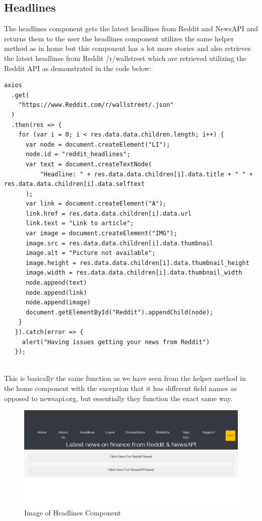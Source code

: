 \subsection{Headlines}
The headlines component gets the latest headlines from Reddit and NewsAPI and returns them to the user
the headlines component utilizes the same helper method as in home but this component has a lot more
stories and also retrieves the latest headlines from Reddit /r/wallstreet which are retrieved utilizing
the Reddit API as demonstrated in the code below:
\begin{verbatim}
axios
  .get(
    "https://www.Reddit.com/r/wallstreet/.json"
  )
  .then(res => {
    for (var i = 0; i < res.data.data.children.length; i++) {
      var node = document.createElement("LI");
      node.id = "reddit_headlines";
      var text = document.createTextNode(
          "Headline: " + res.data.data.children[i].data.title + " " + res.data.data.children[i].data.selftext
      );
      var link = document.createElement("A");
      link.href = res.data.data.children[i].data.url
      link.text = "Link to article";
      var image = document.createElement("IMG");
      image.src = res.data.data.children[i].data.thumbnail
      image.alt = "Picture not available";
      image.height = res.data.data.children[i].data.thumbnail_height
      image.width = res.data.data.children[i].data.thumbnail_width
      node.append(text)
      node.append(link)
      node.append(image)
      document.getElementById("Reddit").appendChild(node);
    }
   }).catch(error => {
     alert("Having issues getting your news from Reddit")
   });
\end{verbatim}
\\
This is basically the same function as we have seen from the helper method in the home component with the
exception that it has different field names as opposed to newsapi.org, but essentially they function the
exact same way.
\begin{figure}[H]
\includegraphics[width=\textwidth]{img/headlinescomponent.png}
\caption{Image of Headlines Component}
\label{fig:Image of headlines component}
\end{figure}
